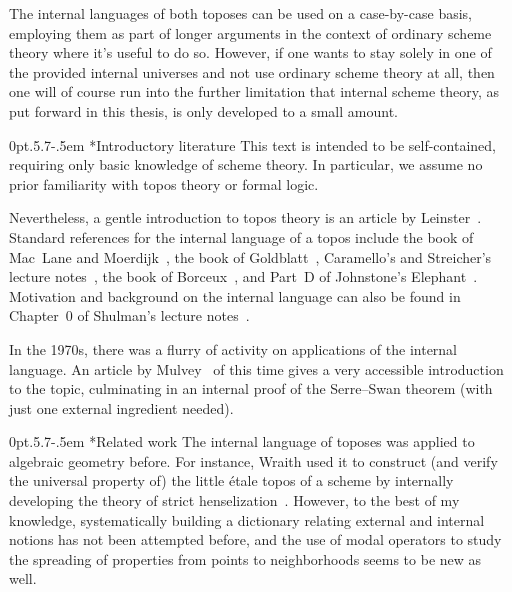 \documentclass[10pt,reqno,a4paper]{amsbook}
\makeatletter
\theoremstyle{definition}
\theoremstyle{plain}
\theoremstyle{remark}
\newcommand{\?}{\,{:}\,}
\renewcommand{\_}{\mathpunct{.}\,}
\def\subsection{\@startsection{subsection}{2}%
  {0pt}{.5\linespacing\@plus.7\linespacing}{-.5em}%
  {\normalfont\bfseries}}
\makeatother
\begin{document}
{The internal languages of both toposes can be used on a case-by-case
basis, employing them as part of longer arguments in the context of ordinary scheme
theory where it's useful to do so. However, if one wants to stay solely in one
of the provided internal universes and not use ordinary scheme theory at all,
then one will of course run into the further limitation that internal scheme
theory, as put forward in this thesis, is only developed to a small amount.


\subsection*{Introductory literature} This text is intended
to be self-contained, requiring only basic knowledge of scheme theory. In
particular, we assume no prior familiarity with topos theory or formal logic.

Nevertheless, a gentle
introduction to topos theory is an article by
Leinster~\cite{leinster:introduction}. Standard references for the internal
language of a topos include the book of Mac~Lane and
Moerdijk~\cite[Chapter~VI]{moerdijk-maclane:sheaves-logic}, the book of
Goldblatt~\cite[Chapter~14]{goldblatt:topoi}, Caramello's and Streicher's lecture
notes~\cite{caramello:preliminaries,streicher:ctcl}, the book of
Borceux~\cite[Chapter~6]{borceux:handbook3}, and Part~D of
Johnstone's Elephant~\cite{johnstone:elephant}. Motivation and background on
the internal language can also be found in Chapter~0 of Shulman's lecture
notes~\cite{shulman:categorical-logic}.

In the 1970s, there was a
flurry of activity on applications of the internal language. An article by
Mulvey~\cite{mulvey:repr} of this time gives a very accessible
introduction to the topic, culminating in an internal proof of the Serre--Swan
theorem (with just one external ingredient needed).


\subsection*{Related work} The internal language of toposes was applied to algebraic geometry before. For
instance, Wraith used it to construct (and verify the universal property
of) the little étale topos of a scheme by internally developing the theory of
strict henselization~\cite{wraith:generic-galois-theory}. However, to the best
of my knowledge, systematically building a dictionary relating external and
internal notions has not been attempted before, and the use of modal operators
to study the spreading of properties from points to neighborhoods seems to be
new as well.

}
\end{document}
